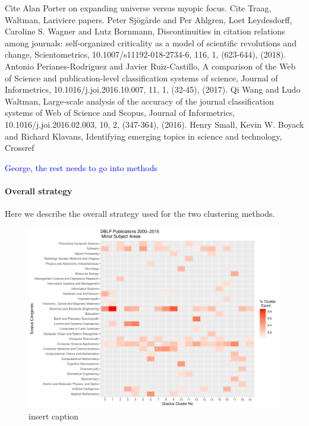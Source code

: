 Cite Alan Porter on expanding universe versus myopic focus. Cite Traag, Waltman, Lariviere papers. Peter Sjögårde and Per Ahlgren, Loet Leydesdorff, Caroline S. Wagner and Lutz Bornmann, Discontinuities in citation relations among journals: self-organized criticality as a model of scientific revolutions and change, Scientometrics, 10.1007/s11192-018-2734-6, 116, 1, (623-644), (2018). Antonio Perianes-Rodriguez and Javier Ruiz-Castillo, A comparison of the Web of Science and publication-level classification systems of science, Journal of Informetrics, 10.1016/j.joi.2016.10.007, 11, 1, (32-45), (2017). Qi Wang and Ludo Waltman, Large-scale analysis of the accuracy of the journal classification systems of Web of Science and Scopus, Journal of Informetrics, 10.1016/j.joi.2016.02.003, 10, 2, (347-364), (2016). Henry Small, Kevin W. Boyack and Richard Klavans, Identifying emerging topics in science and technology, 
Crossref

\textcolor{blue}{George, the rest needs to go into methods}


\paragraph{Overall strategy}

Here we describe the overall strategy used for the two clustering methods.\\
\begin{figure}[ht]
  \includegraphics[scale=0.5]{scopus_dblp_graclus2.pdf}
\caption{insert caption}
\label{heatmap}       %
\end{figure}


